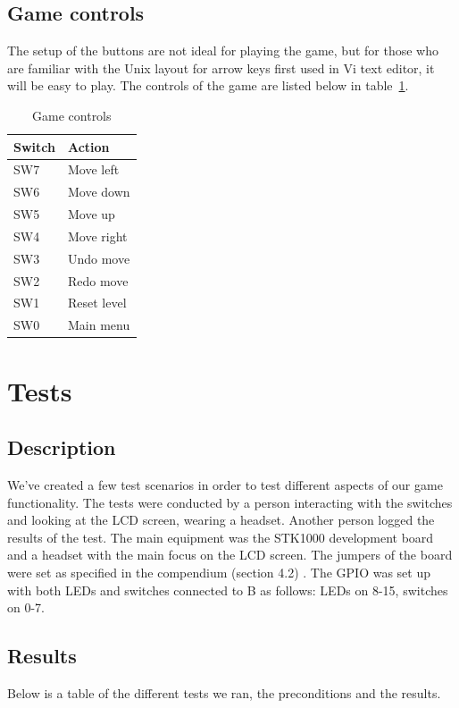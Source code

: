\documentclass[a4paper,11pt]{article}
\begin{document}
\subsection{Game controls}
The setup of the buttons are not ideal for playing the game, but for those who are familiar with the Unix layout for arrow keys first used in Vi text editor, it will be easy to play. The controls of the game are listed below in table~\ref{tab:gamecontrols}. 

\begin{table}[H]
\centering
\begin{tabular}{|l|l|}
\hline \textbf{Switch} & \textbf{Action} \\ 
\hline SW7 & Move left \\ 
\hline SW6 & Move down \\ 
\hline SW5 & Move up \\ 
\hline SW4 & Move right \\ 
\hline SW3 & Undo move \\ 
\hline SW2 & Redo move \\ 
\hline SW1 & Reset level \\ 
\hline SW0 & Main menu \\
\hline 
\end{tabular}
\caption{Game controls} 
\label{tab:gamecontrols}
\end{table}

\section{Tests}
\subsection{Description}
We've created a few test scenarios in order to test different aspects of our game functionality. The tests were conducted by a person interacting with the switches and looking at the LCD screen, wearing a headset. Another person logged the results of the test. The main equipment was the STK1000 development board and a headset with the main focus on the LCD screen. The jumpers of the board were set as specified in the compendium (section 4.2) \cite{komp}. The GPIO was set up with both LEDs and switches connected to B as follows: LEDs on 8-15, switches on 0-7. 

\subsection{Results}
Below is a table of the different tests we ran, the preconditions and the results. 
\end{document}
